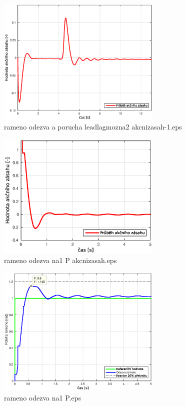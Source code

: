 \documentclass[11pt, a4paper]{article}
\begin{document}
\begin{figure}[H]
\centering
\includegraphics[width=0.7\textwidth]{dobre_grafy/rameno_odezva_a_porucha_leadlagmozna2_akcnizasah-1.eps}
\caption{rameno odezva a porucha leadlagmozna2 akcnizasah-1.eps}
\label{ram_p_akc}
\end{figure}



\begin{figure}[H]
\centering
\includegraphics[width=0.7\textwidth]{dobre_grafy/rameno_odezva_na1_P_akcnizasah.eps}
\caption{rameno odezva na1 P akcnizasah.eps}
\label{ram_p_akc}
\end{figure}

\begin{figure}[H]
\centering
\includegraphics[width=0.7\textwidth]{dobre_grafy/rameno_odezva_na1_P.eps}
\caption{rameno odezva na1 P.eps}
\label{ram_p_akc}
\end{figure}
\end{document}
